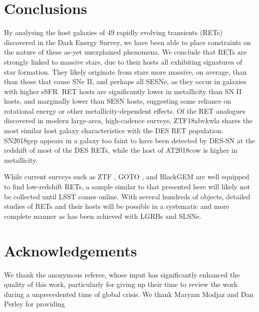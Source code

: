 \documentclass[fleqn,usenatbib,]{mnras}
\begin{document}

\section{Conclusions}
\label{sec:conc}
By analysing the host galaxies of 49 rapidly evolving transients (RETs) discovered in the Dark Energy Survey, we have been able to place constraints on the nature of these as-yet unexplained phenomena. We conclude that RETs are strongly linked to massive stars, due to their hosts all exhibiting signatures of star formation. They likely originate from stars more massive, on average, than than those that cause SNe II, and perhaps all SESNe, as they occur in galaxies with higher sSFR. RET hosts are significantly lower in metallicity than SN II hosts, and marginally lower than SESN hosts, suggesting some reliance on rotational energy or other metallicity-dependent effects.
Of the RET analogues discovered in modern large-area, high-cadence surveys, ZTF18abvkwla shares the most similar host galaxy characteristics with the DES RET population. SN2018gep appears in a galaxy too faint to have been detected by DES-SN at the redshift of most of the DES RETs, while the host of AT2018cow is higher in metallicity.

While current surveys such as ZTF \citep{Bellm2019}, GOTO \citep{Dyer2018}, and BlackGEM \citep{Bloemen2016} are well equipped to find low-redshift RETs, a sample similar to that presented here will likely not be collected until LSST comes online. With several hundreds of objects, detailed studies of RETs and their hosts will be possible in a systematic and more complete manner as has been achieved with LGRBs and SLSNe.

\section*{Acknowledgements}

We thank the anonymous referee, whose input has significantly enhanced the quality of this work, particularly for giving up their time to review the work during a unprecedented time of global crisis. We thank Maryam Modjaz and Dan Perley for providing 
\end{document}
